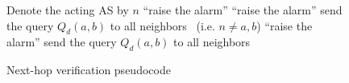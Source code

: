\documentclass[pdftex,twoside,twocolumn,10pt,letterpaper]{article}
\begin{document}
  \begin{figure}[t]
    \centering
    \begin{algorithmic}[1]
      \State Denote the acting AS by $n$
          \State \Return
        \EndIf
            \State ``raise the alarm'' \label{line:sourceRaise}
          \EndIf
          \State \Return
        \EndIf
            \State``raise the alarm'' \label{line:targetRaise}
          \Else
            \State send the query $Q_d(a,b)$ to all neighbors
              \label{line:falseNegativeForward}
          \EndIf
        \Else \ (i.e. $n \neq a,b$)
            \State ``raise the alarm'' \label{line:otherRaise}
          \Else
            \State send the query $Q_d(a,b)$ to all neighbors
              \label{line:cluelessForward}
          \EndIf
        \EndIf
      \EndFunction

    \end{algorithmic}
    \caption{Next-hop verification pseudocode}\label{fig:Pseudocode}
  \end{figure}
\end{document}
